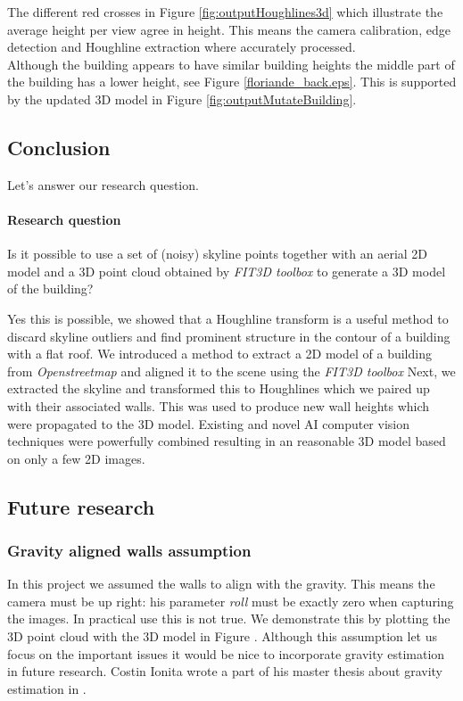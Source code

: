 The different red crosses in Figure \ref{fig:outputHoughlines3d} which illustrate the average height per view 
agree in height. This means the camera calibration, edge detection and Houghline
extraction where accurately processed. \\

Although the building appears to have similar building heights the middle part
of the building has a lower height, see Figure \ref{floriande_back.eps}.
This is supported by the updated 3D model in Figure
\ref{fig:outputMutateBuilding}.




\subsection{Conclusion}
Let's answer our research question.
\paragraph{Research question}
Is it possible to use a set of (noisy) skyline points together with an aerial
2D model and a 3D point cloud obtained by \emph{FIT3D toolbox\cite{FIT3D}} to generate a 3D model of the building?

Yes this is possible, we showed that a Houghline transform is a useful method to
discard skyline outliers and find prominent structure in the contour of a
building with a flat roof. We introduced a method to extract a 2D model of a
building from \emph{Openstreetmap\cite{Openstreetmap}} and aligned it to the
scene using the \emph{FIT3D toolbox\cite{FIT3D}} Next, we extracted the skyline
and transformed this to Houghlines which we paired up with their associated
walls. This was used to produce new wall heights which were propagated to the 3D
model.  Existing and novel AI computer vision techniques were powerfully
combined resulting in an reasonable 3D model based on only a few 2D images. 

\subsection{Future research}
\subsubsection{Gravity aligned walls assumption}
In this project we assumed the walls to align with the gravity.
This means the camera must be up right: his parameter \emph{roll} must be
exactly zero when capturing the images. 
In practical use this is not true. We demonstrate this by plotting the 3D point cloud
with the 3D model in Figure .
Although this assumption let us focus on the important issues it would be nice
to incorporate gravity estimation in future research.
Costin Ionita wrote a part of his master thesis about gravity estimation in
\cite{costin}.\\

